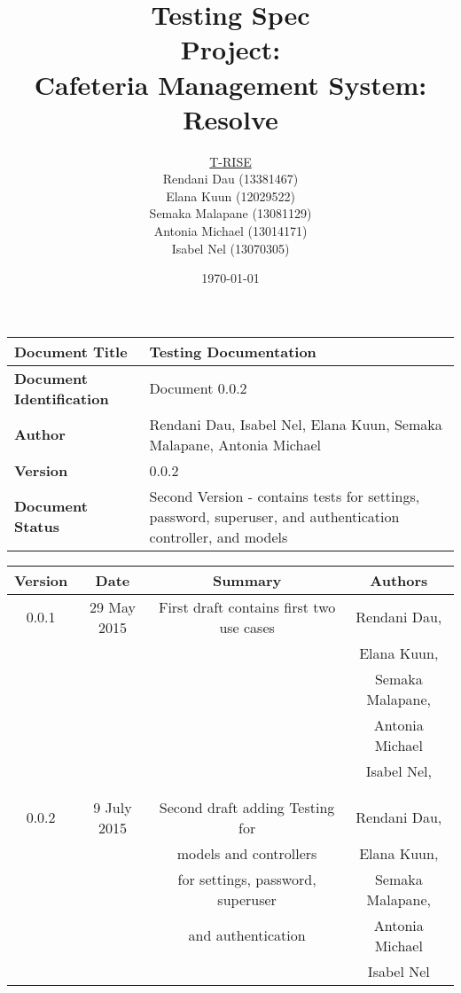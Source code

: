 \documentclass[a4paper,12pt]{article}
\title{\Huge Testing Spec\\ 
	 Project: \\ 
	Cafeteria Management System: Resolve}
\author{
         \underline{T-RISE}\\
          Rendani Dau (13381467) \\
	Elana Kuun (12029522) \\
	Semaka Malapane (13081129) \\
	Antonia Michael (13014171) \\
	Isabel Nel (13070305)}
\date{\today}
\begin{document}
\maketitle
\break

\tableofcontents
\break


 \begin{tabu} to 0.8\textwidth { | X[l] | X[l] | }
 \hline
 \textbf{Document Title} & Testing Documentation \\
 \hline
 \textbf{Document Identification}  & Document 0.0.2  \\
 \hline
 \textbf{Author}  & Rendani Dau, Isabel Nel, Elana Kuun, Semaka Malapane, Antonia Michael \\
 \hline
 \textbf{Version} & 0.0.2 \\
 \hline
 \textbf{Document Status} & Second Version - contains tests for settings, password, superuser, and authentication controller, and models  \\
 \hline
 \end{tabu}

\begin{table}[h!]
\centering
 \begin{tabular}{||c c c c||} 
 \hline
 \textbf{Version} & \textbf{Date} & \textbf{Summary} & \textbf{Authors} \\ [0.5ex] 
 \hline\hline
 0.0.1 & 29 May 2015 &  First draft contains first two use cases  & Rendani Dau, \\ & & & Elana Kuun, \\ & & & Semaka Malapane, \\ & & & Antonia Michael \\ & & & Isabel Nel, \\ & & & \\
 \hline 
 & & & \\
 0.0.2 & 9 July 2015 &  Second draft adding Testing for  & Rendani Dau, \\ & & models and controllers & Elana Kuun, \\ & & for settings, password, superuser & Semaka Malapane, \\ & & and authentication &  Antonia Michael \\ & & & Isabel Nel \\   [1ex] 
 \hline
 \end{tabular}
\end{table}

\pagebreak
\end{document}
